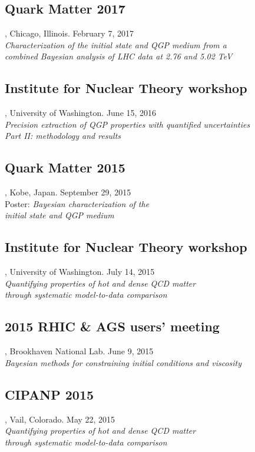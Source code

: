 \documentclass[letterpaper,10pt]{article}
\begin{document}
\subsection{Quark Matter 2017}, Chicago, Illinois. \hfill February 7, 2017 \\
\emph{Characterization of the initial state and QGP medium from a \\ combined Bayesian analysis of LHC data at 2.76 and 5.02 TeV}

\subsection{Institute for Nuclear Theory workshop}, University of Washington. \hfill June 15, 2016 \\
\emph{Precision extraction of QGP properties with quantified uncertainties \\ Part II: methodology and results}

\subsection{Quark Matter 2015}, Kobe, Japan. \hfill September 29, 2015 \\
Poster: \emph{Bayesian characterization of the \\ initial state and QGP medium}

\subsection{Institute for Nuclear Theory workshop}, University of Washington. \hfill July 14, 2015 \\
\emph{Quantifying properties of hot and dense QCD matter \\ through systematic model-to-data comparison}

\subsection{2015 RHIC \& AGS users' meeting}, Brookhaven National Lab. \hfill June 9, 2015 \\
\emph{Bayesian methods for constraining initial conditions and viscosity}

\subsection{CIPANP 2015}, Vail, Colorado. \hfill May 22, 2015 \\
\emph{Quantifying properties of hot and dense QCD matter \\ through systematic model-to-data comparison}
\end{document}
